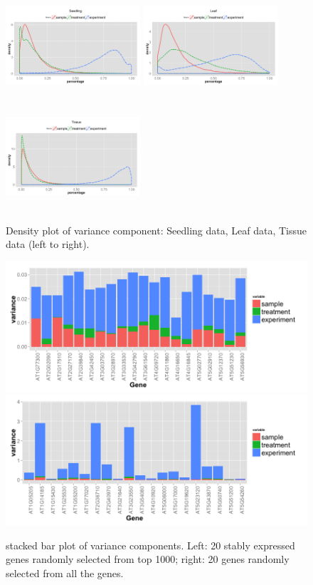 \documentclass[11pt, a4paper]{article}
\begin{document}
 \begin{figure}[h]
\begin{center}
\includegraphics[width=5cm,height=4cm]{Figures/var_dens1.png}
\includegraphics[width=5cm,height=4cm]{Figures/var_dens2.png}
\includegraphics[width=5cm,height=4cm]{Figures/var_dens3.png}
\caption{ Density plot of variance component: Seedling data, Leaf data, Tissue data (left to right).}
\label{fig:densityplot}
\end{center}
\end{figure} 


\begin{figure}[!h]
	\centering
	\includegraphics[width=0.8\linewidth]{Figures/top1000}
	\includegraphics[width=0.8\linewidth]{Figures/all}
	\caption{stacked bar plot of variance components. Left: 20 stably expressed genes randomly selected from top 1000; right: 20 genes randomly selected from all the genes.}
	\label{fig:all}
\end{figure}
\end{document}
